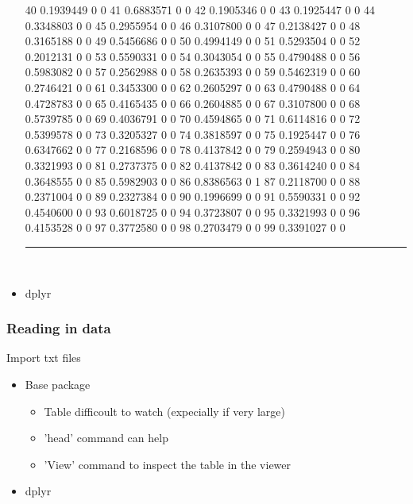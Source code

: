 \documentclass{beamer}
\begin{document}
\begin{frame}[fragile]
\begin{itemize}
\begin{Schunk}
\begin{Soutput}
40   0.1939449   0   0
41   0.6883571   0   0
42   0.1905346   0   0
43   0.1925447   0   0
44   0.3348803   0   0
45   0.2955954   0   0
46   0.3107800   0   0
47   0.2138427   0   0
48   0.3165188   0   0
49   0.5456686   0   0
50   0.4994149   0   0
51   0.5293504   0   0
52   0.2012131   0   0
53   0.5590331   0   0
54   0.3043054   0   0
55   0.4790488   0   0
56   0.5983082   0   0
57   0.2562988   0   0
58   0.2635393   0   0
59   0.5462319   0   0
60   0.2746421   0   0
61   0.3453300   0   0
62   0.2605297   0   0
63   0.4790488   0   0
64   0.4728783   0   0
65   0.4165435   0   0
66   0.2604885   0   0
67   0.3107800   0   0
68   0.5739785   0   0
69   0.4036791   0   0
70   0.4594865   0   0
71   0.6114816   0   0
72   0.5399578   0   0
73   0.3205327   0   0
74   0.3818597   0   0
75   0.1925447   0   0
76   0.6347662   0   0
77   0.2168596   0   0
78   0.4137842   0   0
79   0.2594943   0   0
80   0.3321993   0   0
81   0.2737375   0   0
82   0.4137842   0   0
83   0.3614240   0   0
84   0.3648555   0   0
85   0.5982903   0   0
86   0.8386563   0   1
87   0.2118700   0   0
88   0.2371004   0   0
89   0.2327384   0   0
90   0.1996699   0   0
91   0.5590331   0   0
92   0.4540600   0   0
93   0.6018725   0   0
94   0.3723807   0   0
95   0.3321993   0   0
96   0.4153528   0   0
97   0.3772580   0   0
98   0.2703479   0   0
99   0.3391027   0   0
\end{Soutput}
\end{Schunk}
\rule{\textwidth}{0.4pt}\\
\small
		
		\item dplyr

	\end{itemize}
\end{frame}

\begin{frame}[fragile]
	\frametitle{Reading in data}
	\centering \Large Import txt files
	\begin{itemize}
		\small
		\item Base package
			\begin{itemize}
				\item Table difficoult to watch (expecially if very large) 
				\item 'head' command can help
				\item 'View' command to inspect the table in the viewer
			\end{itemize}
		\item dplyr

	\end{itemize}
\end{frame}
\end{document}
